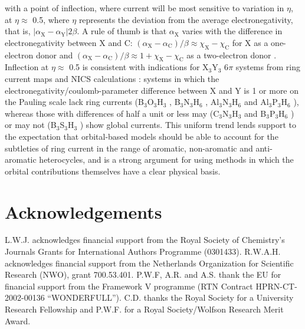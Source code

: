 with a point of inflection, where current will be most sensitive to variation in $\eta$, at $\eta \approx$ 0.5, where $\eta$ represents the deviation
from the average electronegativity, that is, $| \alpha_\mathrm{X}- \alpha_\mathrm{Y} | 2\beta$. A rule of thumb is that $\alpha_\mathrm{X}$
varies with the difference in electronegativity between X and C: $(\alpha_\mathrm{X} - \alpha_\mathrm{C})/\beta \approx \chi_\mathrm{X}-\chi_\mathrm{C}$
for X as a one-electron donor and  $(\alpha_\mathrm{X} - \alpha_\mathrm{C})/\beta \approx 1 + \chi_\mathrm{X}-\chi_\mathrm{C}$ as a two-electron
donor \cite{r22a}. Inflection at $\eta\approx$ 0.5 is consistent with indications for X$_3$Y$_3$ 6$\pi$ systems from ring current maps \cite{r02} and
NICS calculations \cite{r27c}: systems in which the electronegativity/coulomb-parameter difference between X and Y is 1 or
more on the Pauling scale lack ring currents (B$_3$O$_3$H$_3$ \cite{r02,r27c}, B$_3$N$_3$H$_6$ \cite{r02,r27c}, Al$_3$N$_3$H$_6$ \cite{r27c} and
Al$_3$P$_3$H$_6$ \cite{r27c}), whereas those with differences of half a unit or less may (C$_3$N$_3$H$_3$ \cite{r02,r27c} and B$_3$P$_3$H$_6$ \cite{r27c})
or may not (B$_3$S$_3$H$_3$ \cite{r27c}) show global currents. This uniform trend lends support to the expectation that orbital-based models should be able to
account for the subtleties of ring current in the range of aromatic, non-aromatic and anti-aromatic heterocycles, and is a strong argument for
using methods in which the orbital contributions themselves have a clear physical basis.

\section*{Acknowledgements}
L.W.J. acknowledges financial support from the Royal Society of Chemistry's Journals Grants for International Authors Programme (0301433).
R.W.A.H. acknowledges financial support from the Netherlands Organization for Scientific Research (NWO), grant 700.53.401. P.W.F, A.R. and
A.S. thank the EU for financial support from the Framework V programme (RTN Contract HPRN-CT-2002-00136 ``WONDERFULL'').
C.D. thanks the Royal Society for a University Research Fellowship and P.W.F. for a Royal Society/Wolfson Research Merit Award.



